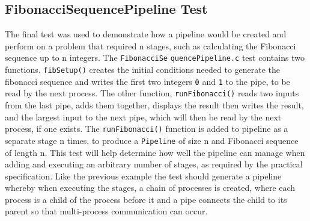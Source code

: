 \documentclass{article}
\begin{document}
    \subsection{FibonacciSequencePipeline Test}
    The final test was used to demonstrate how a pipeline would be created and perform on a problem that required n stages, such as calculating the Fibonacci sequence up to n integers.
    The \verb+FibonacciSe+ \verb+quencePipeline.c+ test contains two functions. \verb+fibSetup()+ creates the initial conditions needed to generate the fibonacci sequence and writes the first two integers \verb+0+ and \verb+1+ to the pipe, to be read by the next process.
    The other function, \verb+runFibonacci()+ reads two inputs from the last pipe, adds them together, displays the result then writes the result, and the largest input to the next pipe, which will then be read by the next process, if one exists.
    The \verb+runFibonacci()+ function is added to pipeline as a separate stage n times, to produce a \verb+Pipeline+ of size n and Fibonacci sequence of length n.
    This test will help determine how well the pipeline can manage when adding and executing an arbitrary number of stages, as required by the practical specification.
    Like the previous example the test should generate a pipeline whereby when executing the stages, a chain of processes is created, where each process is a child of the process before it and a pipe connects the child to its parent so that multi-process communication can occur.
\end{document}
